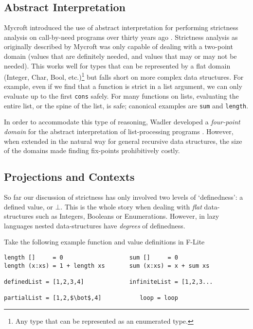\subsection{Abstract Interpretation}

Mycroft introduced the use of abstract interpretation for performing strictness
analysis on call-by-need programs over thirty years ago
\citep{mycroft1980theory}.
Strictness analysis as originally described by Mycroft was only capable of
dealing with a two-point domain (values that are definitely needed, and values
that may or may not be needed). This works well for types that can be
represented by a flat domain (Integer, Char, Bool, etc.)\footnote{Any type that
can be represented as an enumerated type.} but falls short on more complex data
structures. For example, even if we find that a function is strict in a list
argument, we can only evaluate up to the first \verb'cons' safely. For many
functions on lists, evaluating the entire list, or the spine of the list, is
safe; canonical examples are \verb'sum' and \verb'length'.

In order to accommodate this type of reasoning, Wadler developed a
\emph{four-point domain} for the abstract interpretation of list-processing
programs \citep{wadler1987strictness}. However, when extended in the natural way
for general recursive data structures, the size of the domains made finding
fix-points prohibitively costly.

\subsection{Projections and Contexts}
\label{sec:projections}

So far our discussion of strictness has only involved two levels of
`definedness': a defined value, or $\bot$. This is the whole story when dealing
with \emph{flat} data-structures such as Integers, Booleans or Enumerations.
However, in lazy languages nested data-structures have \emph{degrees} of
definedness.

Take the following example function and value definitions in F-Lite
\smallskip

\begin{centering}
\begin{verbatim}
length []     = 0                   sum []     = 0
length (x:xs) = 1 + length xs       sum (x:xs) = x + sum xs

definedList = [1,2,3,4]             infiniteList = [1,2,3...

partialList = [1,2,$\bot$,4]           loop = loop
\end{verbatim}
\end{centering}

